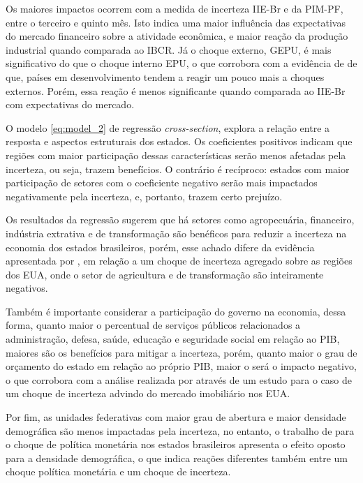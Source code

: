 Os maiores impactos ocorrem com a medida de incerteza \gls{IIE-Br} e da \gls{PIM-PF}, entre o terceiro e quinto mês. Isto indica uma maior influência das expectativas do mercado financeiro sobre a atividade econômica, e maior reação da produção industrial quando comparada ao \gls{IBCR}. Já o choque externo, \gls{GEPU}, é mais significativo do que o choque interno \gls{EPU}, o que corrobora com a evidência de  de que, países em desenvolvimento tendem a reagir um pouco mais a choques externos. Porém, essa reação é menos significante quando comparada ao \gls{IIE-Br} com expectativas do mercado.
\par

O modelo \ref{eq:model_2} de regressão \textit{cross-section}, explora a relação entre a resposta e aspectos estruturais dos estados. Os coeficientes positivos indicam que regiões com maior participação dessas características serão menos afetadas pela incerteza, ou seja, trazem benefícios. O contrário é recíproco: estados com maior participação de setores com o coeficiente negativo serão mais impactados negativamente pela incerteza, e, portanto, trazem certo prejuízo.
\par

Os resultados da regressão sugerem que há setores como agropecuária, financeiro, indústria extrativa e de transformação são benéficos para reduzir a incerteza na economia dos estados brasileiros, porém, esse achado difere da evidência apresentada por , em relação a um choque de incerteza agregado sobre as regiões dos \gls{EUA}, onde o setor de agricultura e de transformação são inteiramente negativos.  
\par

Também é importante considerar a participação do governo na economia, dessa forma, quanto maior o percentual de serviços públicos relacionados a administração, defesa, saúde, educação e seguridade social em relação ao \gls{PIB}, maiores são os benefícios para mitigar a incerteza, porém, quanto maior o grau de orçamento do estado em relação ao próprio \gls{PIB}, maior o será o impacto negativo, o que corrobora com a análise realizada por  através de um estudo para o caso de um choque de incerteza advindo do mercado imobiliário nos \gls{EUA}.
\par

Por fim, as unidades federativas com maior grau de abertura e maior densidade demográfica são menos impactadas pela incerteza, no entanto, o trabalho de  para o choque de política monetária nos estados brasileiros apresenta o efeito oposto para a densidade demográfica, o que indica reações diferentes também entre um choque política monetária e um choque de incerteza.
\par

